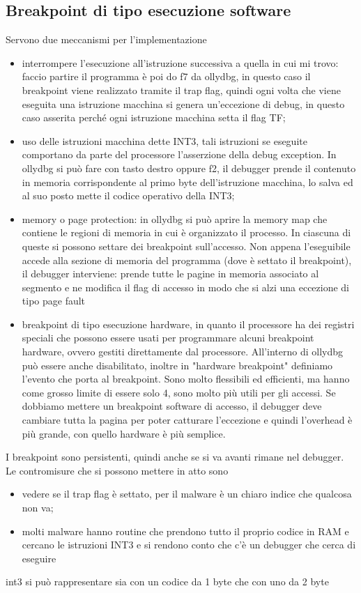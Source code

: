 \documentclass[12pt, oneside]{extbook}
\begin{document}
\subsection{Breakpoint di tipo esecuzione software}
Servono due meccanismi per l'implementazione
\begin{itemize}
\item interrompere l'esecuzione all'istruzione successiva a quella in cui mi trovo: faccio partire il programma è poi do f7 da ollydbg, in questo caso il breakpoint viene realizzato tramite il trap flag, quindi ogni volta che viene eseguita una istruzione macchina si genera un'eccezione di debug, in questo caso asserita perché ogni istruzione macchina setta il flag TF;
\item uso delle istruzioni macchina dette INT3, tali istruzioni se eseguite comportano da parte del processore l'asserzione della debug exception. In ollydbg si può fare con tasto destro oppure f2, il debugger prende il contenuto in memoria corrispondente al primo byte dell'istruzione macchina, lo salva ed al suo posto mette il codice operativo della INT3;
\item memory o page protection: in ollydbg si può aprire la memory map che contiene le regioni di memoria in cui è organizzato il processo. In ciascuna di queste si possono settare dei breakpoint sull'accesso. Non appena l'eseguibile accede alla sezione di memoria del programma (dove è settato il breakpoint), il debugger interviene: prende tutte le pagine in memoria associato al segmento e ne modifica il flag di accesso in modo che si alzi una eccezione di tipo page fault
\item breakpoint di tipo esecuzione hardware, in quanto il processore ha dei registri speciali che possono essere usati per programmare alcuni breakpoint hardware, ovvero gestiti direttamente dal processore. All'interno di ollydbg può essere anche disabilitato, inoltre in "hardware breakpoint" definiamo l'evento che porta al breakpoint. Sono molto flessibili ed efficienti, ma hanno come grosso limite di essere solo 4, sono molto più utili per gli accessi. Se dobbiamo mettere un breakpoint software di accesso, il debugger deve cambiare tutta la pagina per poter catturare l'eccezione e quindi l'overhead è più grande, con quello hardware è più semplice.
\end{itemize}
I breakpoint sono persistenti, quindi anche se si va avanti rimane nel debugger. Le contromisure che si possono mettere in atto sono
\begin{itemize}
\item vedere se il trap flag è settato, per il malware è un chiaro indice che qualcosa non va;
\item molti malware hanno routine che prendono tutto il proprio codice in RAM e cercano le istruzioni INT3 e si rendono conto che c'è un debugger che cerca di eseguire
\end{itemize}
int3 si può rappresentare sia con un codice da 1 byte che con uno da 2 byte
\end{document}
